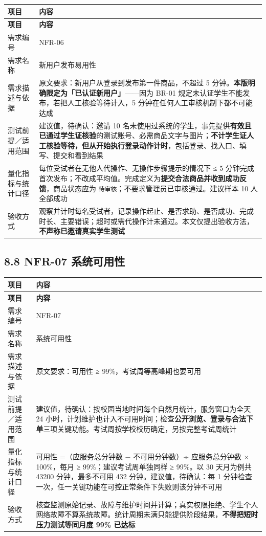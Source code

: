 \documentclass[12pt,a4paper]{ctexart}
\begin{document}
{\footnotesize
\begin{longtable}{|p{2.75cm}|p{13.25cm}|}
\hline
\textbf{项目} & \textbf{内容} \\
\hline
\endfirsthead
\hline
\textbf{项目} & \textbf{内容} \\
\hline
\endhead
\hline
\endfoot
需求编号 & NFR-06 \\
\hline
需求名称 & 新用户发布易用性 \\
\hline
需求描述与依据 & 原文要求：新用户从登录到发布第一件商品，不超过 5 分钟。\textbf{本版明确限定为「已认证新用户」}——因为 BR-01 规定未认证学生不能发布，若把人工核验等待计入，5 分钟在任何人工审核机制下都不可能达成 \\
\hline
测试前提／适用范围 & 建议值，待确认：邀请 10 名未使用过系统的学生，事先提供\textbf{有效且已通过学生证核验}的测试账号、必需商品文字与图片；\textbf{不计学生证人工核验等待，但从开始执行登录动作计时}，包括登录、找入口、填写、提交和看到结果 \\
\hline
量化指标与统计口径 & 每位受试者在无他人代操作、无操作步骤提示的情况下 ≤ 5 分钟完成首次发布；不改成平均值。完成定义为\textbf{提交合法商品并收到成功反馈}，商品状态应为 \texttt{待审核}；不要求管理员已审核通过。建议样本 10 人全部成功 \\
\hline
验收方式 & 观察并计时每名受试者，记录操作起止、是否求助、是否成功、完成时长、主要错误；超时或需代操作计未通过。本文仅提出验收方法，\textbf{不声称已邀请真实学生测试} \\
\hline
\end{longtable}
}



\subsection*{8.8 NFR-07 系统可用性}

{\footnotesize
\begin{longtable}{|p{2.75cm}|p{13.25cm}|}
\hline
\textbf{项目} & \textbf{内容} \\
\hline
\endfirsthead
\hline
\textbf{项目} & \textbf{内容} \\
\hline
\endhead
\hline
\endfoot
需求编号 & NFR-07 \\
\hline
需求名称 & 系统可用性 \\
\hline
需求描述与依据 & 原文要求：可用性 ≥ 99\%，考试周等高峰期也要可用 \\
\hline
测试前提／适用范围 & 建议值，待确认：按校园当地时间每个自然月统计，服务窗口为全天 24 小时，计划维护也计入不可用时间；检查\textbf{公开浏览、登录与合法下单}三项关键功能。考试周按学校校历确定，另按完整考试周统计 \\
\hline
量化指标与统计口径 & 可用性 =（应服务总分钟数 − 不可用分钟数）÷ 应服务总分钟数 × 100\%，每月 ≥ 99\%；建议考试周单独同样 ≥ 99\%。以 30 天月为例共 43200 分钟，最多不可用 432 分钟。建议值，待确认：每 1 分钟检查一次，任一关键功能在可控正常条件下失败则该分钟不可用 \\
\hline
验收方式 & 核查监测原始记录、故障与维护时间并计算；真实权限拒绝、学生个人网络故障不算系统故障。统计周期未满只能提供阶段结果，\textbf{不得把短时压力测试等同月度 99\% 已达标} \\
\hline
\end{longtable}
}
\end{document}
